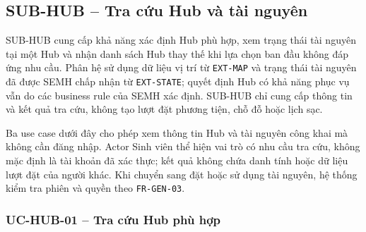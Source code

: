 \subsection{SUB-HUB -- Tra cứu Hub và tài nguyên}

SUB-HUB cung cấp khả năng xác định Hub phù hợp, xem trạng thái tài nguyên tại một Hub và nhận danh sách Hub thay thế khi lựa chọn ban đầu không đáp ứng nhu cầu. Phân hệ sử dụng dữ liệu vị trí từ \texttt{EXT-MAP} và trạng thái tài nguyên đã được SEMH chấp nhận từ \texttt{EXT-STATE}; quyết định Hub có khả năng phục vụ vẫn do các business rule của SEMH xác định. SUB-HUB chỉ cung cấp thông tin và kết quả tra cứu, không tạo lượt đặt phương tiện, chỗ đỗ hoặc lịch sạc.

Ba use case dưới đây cho phép xem thông tin Hub và tài nguyên công khai mà không cần đăng nhập. Actor Sinh viên thể hiện vai trò có nhu cầu tra cứu, không mặc định là tài khoản đã xác thực; kết quả không chứa danh tính hoặc dữ liệu lượt đặt của người khác. Khi chuyển sang đặt hoặc sử dụng tài nguyên, hệ thống kiểm tra phiên và quyền theo \texttt{FR-GEN-03}.

\subsubsection{UC-HUB-01 -- Tra cứu Hub phù hợp}


